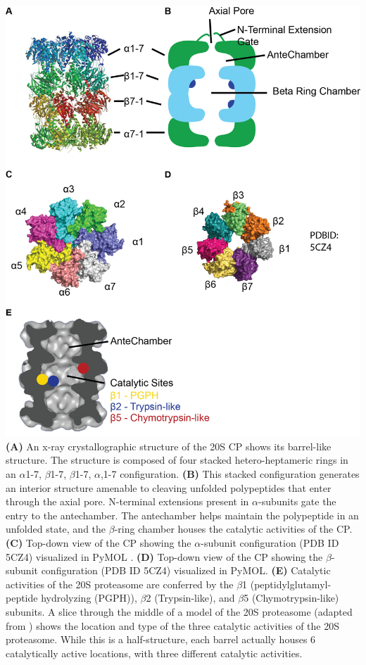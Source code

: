 \begin{FPfigure}
	\centering
	\includegraphics[width=\columnwidth]{intro/cpdetails.png}
	{\textbf{(A)} An x-ray crystallographic structure of the 20S CP shows its barrel-like structure. The structure is composed of four stacked hetero-heptameric rings in an $\alpha$1-7, $\beta$1-7, $\beta$1-7, $\alpha$,1-7 configuration. \textbf{(B)} This stacked configuration generates an interior structure amenable to cleaving unfolded polypeptides that enter through the axial pore. N-terminal extensions present in $\alpha$-subunits gate the entry to the antechamber. The antechamber helps maintain the polypeptide in an unfolded state, and the $\beta$-ring chamber houses the catalytic activities of the CP. \textbf{(C)} Top-down view of the CP showing the $\alpha$-subunit configuration (PDB ID 5CZ4) visualized in PyMOL \citep{PyMOL}. \textbf{(D)} Top-down view of the CP showing the $\beta$-subunit configuration (PDB ID 5CZ4) visualized in PyMOL. \textbf{(E)} Catalytic activities of the 20S proteasome are conferred by the $\beta$1 (peptidylglutamyl-peptide hydrolyzing (PGPH)), $\beta$2 (Trypsin-like), and $\beta$5 (Chymotrypsin-like) subunits. A slice through the middle of a model of the 20S proteasome (adapted from \citep{kisselev12}) shows the location and type of the three catalytic activities of the 20S proteasome. While this is a half-structure, each barrel actually houses 6 catalytically active locations, with three different catalytic activities.}
	\label{fig:cpdetails}
\end{FPfigure}

